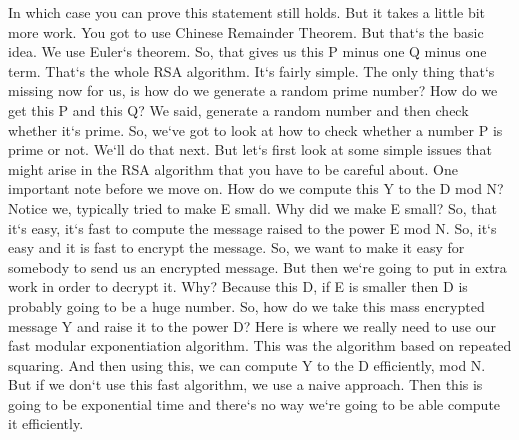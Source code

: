 In which case you can prove this statement still holds.
But it takes a little bit more work.
You got to use Chinese Remainder Theorem.
But that`s the basic idea.
We use Euler`s theorem.
So, that gives us this P minus one Q minus one term.
That`s the whole RSA algorithm.
It`s fairly simple.
The only thing that`s missing now for us, is how do we generate a random prime number? How do we get this P and this Q? We said, generate a random number and then check whether it`s prime.
So, we`ve got to look at how to check whether a number P is prime or not.
We`ll do that next.
But let`s first look at some simple issues that might arise in the RSA algorithm that you have to be careful about.
One important note before we move on.
How do we compute this Y to the D mod N? Notice we, typically tried to make E small.
Why did we make E small? So, that it`s easy, it`s fast to compute the message raised to the power E mod N\@.
So, it`s easy and it is fast to encrypt the message.
So, we want to make it easy for somebody to send us an encrypted message.
But then we`re going to put in extra work in order to decrypt it.
Why? Because this D, if E is smaller then D is probably going to be a huge number.
So, how do we take this mass encrypted message Y and raise it to the power D? Here is where we really need to use our fast modular exponentiation algorithm.
This was the algorithm based on repeated squaring.
And then using this, we can compute Y to the D efficiently, mod N\@.
But if we don`t use this fast algorithm, we use a naive approach.
Then this is going to be exponential time and there`s no way we`re going to be able compute it efficiently.


